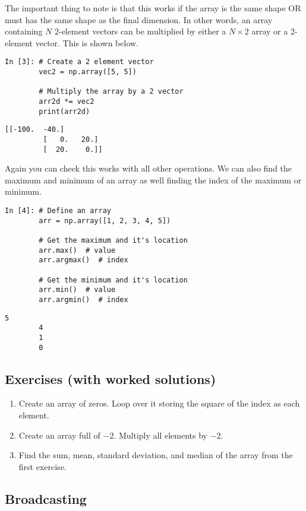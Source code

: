 The important thing to note is that this works if the array is the same shape OR must has the same shape as the final dimension. In other words, an array containing $N$ 2-element vectors can be multiplied by either a $N \times 2$ array or a 2-element vector. This is shown below.
\begin{lstlisting}[style=PY]
In [3]: # Create a 2 element vector
        vec2 = np.array([5, 5])
        
        # Multiply the array by a 2 vector
        arr2d *= vec2
        print(arr2d)
\end{lstlisting}
\begin{lstlisting}[style=PY, backgroundcolor=\color{white}]
        [[-100.  -40.]
         [   0.   20.]
         [  20.    0.]]
\end{lstlisting}
Again you can check this works with all other operations.
\newpage
We can also find the maximum and minimum of an array as well finding the index of the maximum or minimum.
\begin{lstlisting}[style=PY]
In [4]: # Define an array
        arr = np.array([1, 2, 3, 4, 5])
        
        # Get the maximum and it's location
        arr.max()  # value
        arr.argmax()  # index
        
        # Get the minimum and it's location
        arr.min()  # value
        arr.argmin()  # index
\end{lstlisting}
\begin{lstlisting}[style=PY, backgroundcolor=\color{white}]
        5
        4
        1
        0
\end{lstlisting}

\subsection{Exercises (with worked solutions)} \label{sec:exc_array}
\begin{enumerate}
\item Create an array of zeros. Loop over it storing the square of the index as each element.
\item Create an array full of $-2$. Multiply all elements by $-2$.
\item Find the sum, mean, standard deviation, and median of the array from the first exercise.
\end{enumerate}

\subsection{Broadcasting}

